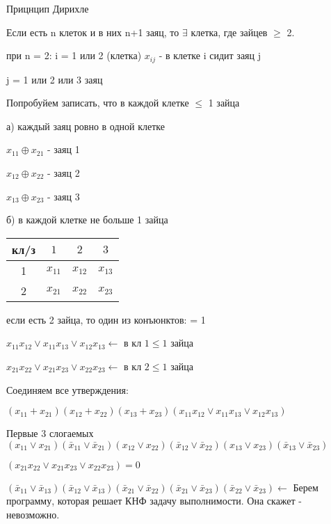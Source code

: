 \documentclass[russian]{lecture-notes}
\begin{document}
	\begin{example}
		Прицнцип Дирихле

			Если есть n клеток и в них n+1 заяц, то $\exists$ клетка, где зайцев $\geqslant$ 2.

		при n = 2: i = 1 или 2 (клетка) \qquad $x_{ij} $ - в клетке i сидит заяц j

		\qquad \qquad \quad j = 1 или 2 или 3 заяц

		Попробуйем записать, что в каждой клетке $\leqslant$ 1 зайца

		а) каждый заяц ровно в одной клетке

		$x_{11} \oplus x_{21}$ - заяц 1

		$x_{12} \oplus x_{22}$ - заяц 2

		$x_{13} \oplus x_{23}$ - заяц 3

		б) в каждой клетке не больше 1 зайца

			\begin{table}[h!]
	\centering
	\begin{tabular}{|c|c|c|c|}
		\hline
		кл/з & $1$ & $2$ & $3$ \\ \hline
		1 & $x_{11}$ & $x_{12}$ & $x_{13}$ \\ \hline
		2 & $x_{21}$ & $x_{22}$ & $x_{23}$ \\ \hline
	\end{tabular}
\end{table}

		если есть 2 зайца, то один из конъюнктов: = 1

		$x_{11}x_{12} \lor x_{11}x_{13} \lor x_{12}x_{13} \longleftarrow$ в кл $1 \leqslant 1$ зайца

		$x_{21}x_{22} \lor x_{21}x_{23} \lor x_{22}x_{23} \longleftarrow$ в кл $2 \leqslant 1$ зайца

		Соединяем все утверждения:

		$(x_{11} + x_{21})(x_{12} + x_{22})(x_{13} + x_{23})(x_{11}x_{12} \lor x_{11}x_{13} \lor x_{12}x_{13})$ %

		Первые 3 слогаемых $(x_{11} \lor x_{21})(\bar{x}_{11} \lor \bar{x}_{21})(x_{12} \lor x_{22})
		(\bar{x}_{12} \lor \bar{x}_{22})(x_{13} \lor x_{23})(\bar{x}_{13} \lor \bar{x}_{23})$

		$(x_{21}x_{22} \lor x_{21}x_{23} \lor x_{22}x_{23}) = 0$

		$(\bar{x}_{11} \lor \bar{x}_{13})(\bar{x}_{12} \lor \bar{x}_{13})(\bar{x}_{21} \lor \bar{x}_{22})
		(\bar{x}_{21} \lor \bar{x}_{23})(\bar{x}_{22} \lor \bar{x}_{23}) \longleftarrow$
		Берем программу, которая решает КНФ задачу выполнимости. Она скажет - невозможно.

		\end{example}
\end{document}
